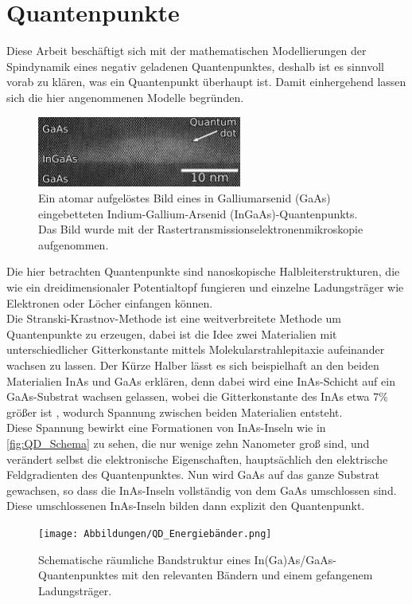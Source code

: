 \chapter{Quantenpunkte}

\noindent Diese Arbeit beschäftigt sich mit der mathematischen Modellierungen der Spindynamik eines negativ geladenen
Quantenpunktes, deshalb ist es sinnvoll vorab zu klären, was ein Quantenpunkt überhaupt ist. Damit einhergehend lassen sich die hier angenommenen Modelle begründen.\\
\begin{figure}[h!]
    \centering
    \includegraphics[width = 0.6\textwidth]{Abbildungen/Gaas_inas_quantum_dot_wikimedia.jpg}
    \caption{Ein atomar aufgelöstes Bild eines in Galliumarsenid (GaAs) eingebetteten Indium-Gallium-Arsenid (InGaAs)-Quantenpunkts. 
    Das Bild wurde mit der Rastertransmissionselektronenmikroskopie aufgenommen\cite{quantumdot_wikimedia}.}
    \label{fig:QD_Schema}
\end{figure}

\noindent Die hier betrachten Quantenpunkte sind nanoskopische Halbleiterstrukturen, die wie ein dreidimensionaler Potentialtopf fungieren
und einzelne Ladungsträger wie Elektronen oder Löcher einfangen können.\\
Die Stranski-Krastnov-Methode ist eine weitverbreitete Methode um Quantenpunkte zu erzeugen, dabei ist die Idee zwei Materialien mit 
unterschiedlicher Gitterkonstante mittels Molekularstrahlepitaxie aufeinander wachsen zu lassen. Der Kürze Halber lässt es sich 
beispielhaft an den beiden Materialien InAs und GaAs erklären, denn dabei wird eine InAs-Schicht auf ein GaAs-Substrat wachsen gelassen, 
wobei die Gitterkonstante des InAs etwa 7\% größer ist \cite{RevModPhys.85.79}, wodurch Spannung zwischen beiden Materialien entsteht. \\
\noindent Diese Spannung bewirkt eine Formationen von InAs-Inseln wie in \autoref{fig:QD_Schema} zu sehen, die nur wenige zehn 
Nanometer groß sind, und verändert selbst die elektronische Eigenschaften, hauptsächlich den elektrische Feldgradienten des 
Quantenpunktes. Nun wird GaAs auf das ganze Substrat gewachsen, so dass die InAs-Inseln vollständig von 
dem GaAs umschlossen sind. Diese umschlossenen InAs-Inseln bilden dann explizit den Quantenpunkt.\\
\begin{figure}
   \centering
    \texttt{[image: Abbildungen/QD\_Energiebänder.png]}
    \caption{Schematische räumliche Bandstruktur eines In(Ga)As/GaAs-Quantenpunktes mit den relevanten Bändern und einem 
    gefangenem Ladungsträger.}
    \label{fig:QD_Bandstruktur}
\end{figure}


